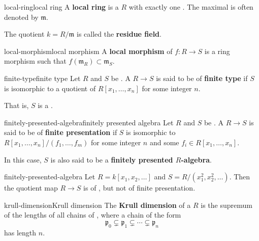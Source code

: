 \begin{topic}{local-ring}{local ring}
    A \textbf{local ring} is a  $R$ with exactly one . The maximal is often denoted by $\mathfrak{m}$.
    
    The quotient $k = R/\mathfrak{m}$ is called the \textbf{residue field}.
\end{topic}

\begin{topic}{local-morphism}{local morphism}
    A \textbf{local morphism} of  $f : R \to S$ is a ring morphism such that $f(\mathfrak{m}_R) \subset \mathfrak{m}_S$.
\end{topic}

\begin{topic}{finite-type}{finite type}
    Let $R$ and $S$ be . A  $R \to S$ is said to be of \textbf{finite type} if $S$ is isomorphic to a quotient of $R[x_1, \ldots, x_n]$ for some integer $n$.
    
    That is, $S$ is a .
\end{topic}

\begin{topic}{finitely-presented-algebra}{finitely presented algebra}
    Let $R$ and $S$ be . A  $R \to S$ is said to be of \textbf{finite presentation} if $S$ is isomorphic to $R[x_1, \ldots, x_n] / (f_1, \ldots, f_m)$ for some integer $n$ and some $f_i \in R[x_1, \ldots, x_n]$.
    
    In this case, $S$ is also said to be a \textbf{finitely presented $R$-algebra}.
\end{topic}

\begin{example}{finitely-presented-algebra}
    Let $R = k[x_1, x_2, \ldots]$ and $S = R / (x_1^2, x_2^2, \ldots)$. Then the quotient map $R \to S$ is of , but not of finite presentation.
\end{example}

\begin{topic}{krull-dimension}{Krull dimension}
    The \textbf{Krull dimension} of a  $R$ is the supremum of the lengths of all chains of , where a chain of the form
    \[ \mathfrak{p}_0 \subsetneq \mathfrak{p}_1 \subsetneq \cdots \subsetneq \mathfrak{p}_n \]
    has length $n$.
\end{topic}

